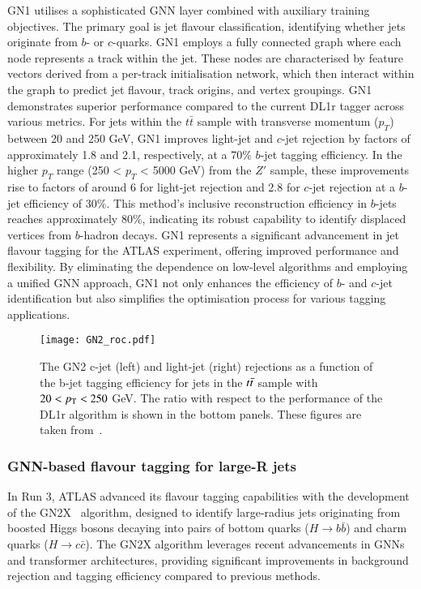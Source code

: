             GN1 utilises a sophisticated GNN layer combined with auxiliary training objectives. The primary goal is jet flavour 
            classification, identifying whether jets originate from \(b\)- or \(c\)-quarks. GN1 employs a fully connected graph where each node 
            represents a track within the jet. These nodes are characterised by feature vectors derived from a per-track initialisation network, 
            which then interact within the graph to predict jet flavour, track origins, and vertex groupings. 
            GN1 demonstrates superior performance compared to the current DL1r tagger across various metrics. For jets within the \(t\bar{t}\) 
            sample with transverse momentum (\(p_T\)) between 20 and 250 GeV, GN1 improves light-jet and \(c\)-jet rejection by factors of 
            approximately 1.8 and 2.1, respectively, at a 70\% \(b\)-jet tagging efficiency. In the higher \(p_T\) range (250 < \(p_T\) < 5000 GeV) 
            from the \(Z'\) sample, these improvements rise to factors of around 6 for light-jet rejection and 2.8 for \(c\)-jet rejection at a \(b\)-jet efficiency of 30\%.
            This method's inclusive reconstruction efficiency in \(b\)-jets reaches approximately 80\%, indicating its robust capability to 
            identify displaced vertices from \(b\)-hadron decays.
            GN1 represents a significant advancement in jet flavour tagging for the ATLAS experiment, offering improved performance and flexibility. 
            By eliminating the dependence on low-level algorithms and employing a unified GNN approach, GN1 not only enhances the efficiency of 
            \(b\)- and \(c\)-jet identification but also simplifies the optimisation process for various tagging applications.
            \begin{figure}[htbp]
                \centering
                \texttt{[image: GN2\_roc.pdf]}
                \caption{
                    The GN2 c-jet (left) and light-jet (right) rejections as a function of the b-jet tagging efficiency for jets in the $t\bar{t}$ sample with $20 < p_{\text{T}} < 250$ GeV. 
                    The ratio with respect to the performance of the DL1r algorithm is shown in the bottom panels. 
                    These figures are taken from~\cite{ATL-PHYS-PUB-2022-027}.
                }
                \label{fig:GN2_roc}
            \end{figure}
        
        \subsubsection{GNN-based flavour tagging for large-R jets}
            In Run 3, ATLAS advanced its flavour tagging capabilities with the development of the GN2X~\cite{ATL-PHYS-PUB-2023-021} algorithm, designed to 
            identify large-radius jets originating from boosted Higgs bosons decaying into pairs of bottom quarks (\(H \to b\bar{b}\)) and charm quarks 
            (\(H \to c\bar{c}\)). The GN2X algorithm leverages recent advancements in GNNs and transformer architectures, 
            providing significant improvements in background rejection and tagging efficiency compared to previous methods.
            
